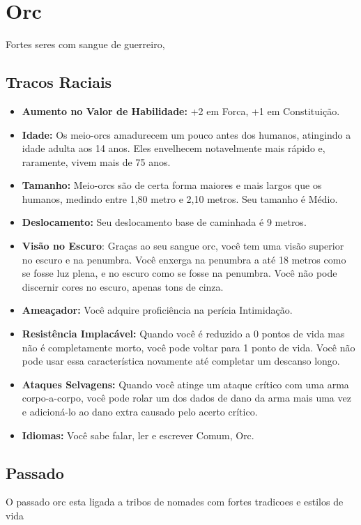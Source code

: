 \documentclass{book}
\begin{document}
\chapter{Orc}
Fortes seres com sangue de guerreiro,
\section{Tracos Raciais}
\begin{itemize}
    \item \textbf{Aumento no Valor de Habilidade:} +2 em Forca, +1 em Constituição.
    \item \textbf{Idade:} Os meio-orcs amadurecem um pouco antes dos humanos, atingindo a 
         idade adulta aos 14 anos. Eles envelhecem notavelmente mais rápido e, raramente,
         vivem mais de 75 anos.
    \item \textbf{Tamanho:} Meio-orcs são de certa forma maiores e mais largos que os 
          humanos, medindo entre 1,80 metro e 2,10 metros. Seu tamanho é Médio.
    \item \textbf{Deslocamento:} Seu deslocamento base de caminhada é 9 metros.
    \item \textbf{Visão no Escuro}: Graças ao seu sangue orc, você tem uma visão superior no 
        escuro e na penumbra. Você enxerga na penumbra a até 18 metros como se fosse luz
         plena, e no escuro como se fosse na penumbra. Você não pode discernir cores no 
         escuro, apenas tons de cinza.
    \item \textbf{Ameaçador:} Você adquire proficiência na perícia Intimidação.
    \item \textbf{Resistência Implacável:} Quando você é reduzido a 0 pontos de vida mas não 
         é completamente morto, você pode voltar para 1 ponto de vida. Você não pode usar essa
         característica novamente até completar um descanso longo.
     \item \textbf{Ataques Selvagens:} Quando você atinge um ataque crítico com uma arma 
         corpo-a-corpo, você pode rolar um dos dados de dano da arma mais uma vez e 
         adicioná-lo ao dano extra causado pelo acerto crítico.
     \item \textbf{Idiomas:} Você sabe falar, ler e escrever Comum, Orc.
\end{itemize}
\section{Passado}
O passado orc esta ligada a tribos de nomades com fortes tradicoes e estilos de vida
\end{document}
